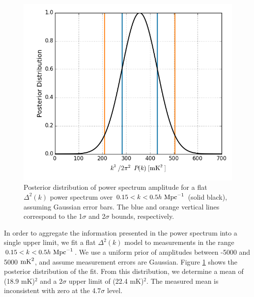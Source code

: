 \documentclass[twocolumn,numberedappendix]{emulateapj} \shorttitle{New Limits on the 21 cm Power Spectrum at $z=8.4$}
\newcommand{\hMpci}{h\ {\rm Mpc}^{-1}}
\newcommand{\mKlimit}{(22.4 mK)$^2$}
\begin{document}
\begin{figure}\centering
\includegraphics[width=\columnwidth]{plots/flat_k3pk_posterior.png}
\caption{
Posterior distribution of power spectrum amplitude for a flat $\Delta^{2}(k)$
power spectrum over $0.15<k<0.5\hMpci$ (solid black),
assuming Gaussian error bars. The blue and orange
vertical lines correspond to the 1$\sigma$ and 2$\sigma$ bounds, respectively.
}
\label{fig:final_posterior}
\end{figure}

In order to aggregate the information presented in the power spectrum into
a single upper limit, we fit a flat $\Delta^2(k)$ model to measurements
in the range $0.15<k<0.5\hMpci$.  We use a uniform prior of amplitudes between
-5000 and 5000 ${\rm mK}^2$, and assume measurement errors are Gaussian.
Figure \ref{fig:final_posterior} shows the posterior distribution of the fit.
From this distribution, we determine a mean of
(18.9 mK)$^2$ and a $2\sigma$ upper limit of \mKlimit.
The measured mean is inconsistent with zero at the 4.7$\sigma$ level.
\end{document}

